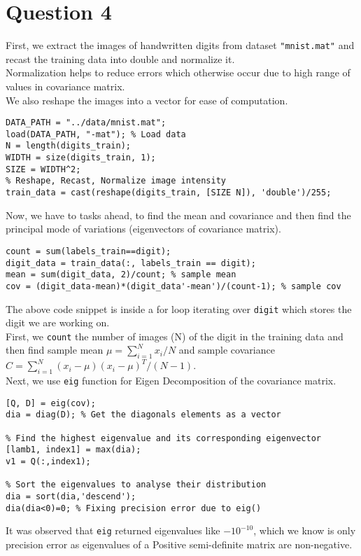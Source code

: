 \documentclass[11pt, fleqn]{article}
\begin{document}
\newpage
\section*{Question 4}
\setcounter{equation}{0}
\setcounter{figure}{0}

First, we extract the images of handwritten digits from dataset \verb!"mnist.mat"! and recast the training data into double and normalize it. \\
Normalization helps to reduce errors which otherwise occur due to high range of values in covariance matrix. \\
We also reshape the images into a vector for ease of computation.
\begin{verbatim}
DATA_PATH = "../data/mnist.mat";
load(DATA_PATH, "-mat"); % Load data
N = length(digits_train);
WIDTH = size(digits_train, 1);
SIZE = WIDTH^2;
% Reshape, Recast, Normalize image intensity
train_data = cast(reshape(digits_train, [SIZE N]), 'double')/255;
\end{verbatim}

Now, we have to tasks ahead, to find the mean and covariance and then find the principal mode of variations (eigenvectors of covariance matrix).
\begin{verbatim}
count = sum(labels_train==digit);
digit_data = train_data(:, labels_train == digit);
mean = sum(digit_data, 2)/count; % sample mean
cov = (digit_data-mean)*(digit_data'-mean')/(count-1); % sample cov
\end{verbatim}
The above code snippet is inside a for loop iterating over \verb!digit! which stores the digit we are working on. \\
First, we \verb!count! the number of images (N) of the digit in the training data and then find sample mean $\mu = \sum_{i=1}^N x_i / N$ and sample covariance $C = \sum_{i=1}^N (x_i - \mu) (x_i - \mu)^T / (N - 1)$. \\

Next, we use \verb!eig! function for Eigen Decomposition of the covariance matrix.
\begin{verbatim}
[Q, D] = eig(cov);
dia = diag(D); % Get the diagonals elements as a vector

% Find the highest eigenvalue and its corresponding eigenvector
[lamb1, index1] = max(dia);
v1 = Q(:,index1);

% Sort the eigenvalues to analyse their distribution
dia = sort(dia,'descend');
dia(dia<0)=0; % Fixing precision error due to eig()
\end{verbatim}
It was observed that \verb!eig! returned eigenvalues like $-10^{-10}$, which we know is only precision error as eigenvalues of a Positive semi-definite matrix are non-negative. \\
\end{document}
